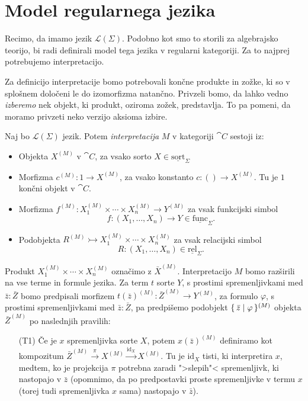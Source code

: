 \documentclass[../kategoricna_logika.tex]{subfiles}
\begin{document}
\section{Model regularnega jezika}
Recimo, da imamo jezik \(\mathcal{L}(\Sigma)\). Podobno kot smo to
storili za algebrajsko teorijo, bi radi definirali model tega jezika v
regularni kategoriji.  Za to najprej potrebujemo interpretacijo.
\begin{opomba}
  Za definicijo interpretacije bomo potrebovali končne produkte in
  zožke, ki so v splošnem določeni le do izomorfizma natančno.
  Privzeli bomo, da lahko vedno \emph{izberemo} nek objekt, ki
  produkt, oziroma zožek, predstavlja. To pa pomeni, da moramo
  privzeti neko verzijo aksioma izbire.
\end{opomba}
\begin{definicija}
  Naj bo $\mathcal{L}(\Sigma)$ jezik. Potem \emph{interpretacija} $M$
  v kategoriji $\cat{C}$ sestoji iz:
  \begin{itemize}
  \item Objekta $X^{(M)}$ v $\cat{C}$, za vsako sorto
    $X \in \underline{\mathrm{sort}}_\Sigma$
  \item Morfizma $c^{(M)} : 1 \to X^{(M)}$, za vsako konstanto
    $c : () \to X^{(M)}$. Tu je $1$ končni objekt
    v $\cat{C}$.
  \item Morfizma
    $f^{(M)} : X_1^{(M)} \times \cdots \times X_n^{(M)} \to Y^{(M)}$
    za vsak funkcijski simbol
    \[f : (X_1, \ldots, X_n) \to Y \in
      \underline{\mathrm{func}}_\Sigma.\]
  \item Podobjekta
    $R^{(M)} \rightarrowtail X_1^{(M)} \times \cdots \times X_n^{(M)}$
    za vsak relacijski simbol
    \[R : (X_1, \ldots, X_n) \in
      \underline{\mathrm{rel}}_\Sigma.\]
  \end{itemize}
  Produkt $X_1^{(M)} \times \cdots \times X_n^{(M)}$ označimo z
  $\bar{X}^{(M)}$.  Interpretacijo $M$ bomo razširili na vse terme in
  formule jezika.  Za term $t$ sorte $Y$, s prostimi spremenljivkami
  med $\bar{z} : \bar{Z}$ bomo predpisali morfizem
  $t(\bar{z})^{(M)} : \bar{Z}^{(M)} \to Y^{(M)}$, za formulo
  $\varphi$, s prostimi spremenljivkami med $\bar{z} : \bar{Z}$, pa
  predpišemo podobjekt $\lbrace\,\bar{z} \mid \varphi\,\rbrace^{(M)}$ objekta
  $\bar{Z}^{(M)}$ po naslednjih pravilih:
  \begin{itemize}
  \item[(T1)] Če je $x$ spremenljivka sorte $X$, potem
    $x(\bar{z})^{(M)}$ definiramo kot kompo\-zi\-tum
    $\bar{Z}^{(M)} \xrightarrow{\pi} X^{(M)}
    \xrightarrow{\mathrm{id}_X} X^{(M)}$.  Tu je $\mathrm{id}_X$
    tisti, ki interpretira $x$, medtem, ko je projekcija $\pi$
    potrebna zaradi ">slepih"< spremenljivk, ki nastopajo v $\bar{z}$
    (opomnimo, da po predpostavki proste spremenljivke v termu $x$
    (torej tudi spremenljivka $x$ sama) nastopajo v $\bar{z}$).


\end{itemize}
\end{definicija}
\end{document}
